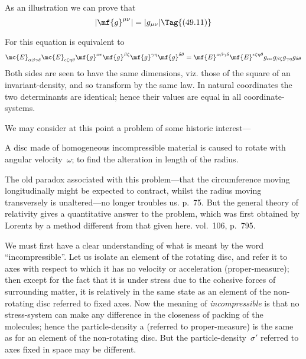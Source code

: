 \documentclass[12pt]{book}
\begin{document}
As an illustration we can prove that
\[
|\mf{g}^{\mu\nu}| = |g_{\mu\nu}|
\Tag{(49.11)}
\]

For this equation is equivalent to
\[
\mc{E}_{\alpha\beta\gamma\delta} \mc{E}_{\epsilon\zeta\eta\theta}
  \mf{g}^{\alpha\epsilon} \mf{g}^{\beta\zeta} \mf{g}^{\gamma\eta} \mf{g}^{\delta\theta} =
\mf{E}^{\alpha\beta\gamma\delta} \mf{E}^{\epsilon\zeta\eta\theta}
  g_{\alpha\epsilon} g_{\beta\zeta} g_{\gamma\eta} g_{\delta\theta}
\]
Both sides are seen to have the same dimensions, viz. those of the square of an invariant\hyp{}density, and so transform
by the same law.
In natural coordinates the two determinants are identical; hence their values are equal in all coordinate\hyp{}systems.

%
%

We may consider at this point a problem of some historic interest---

A disc made of homogeneous incompressible material is caused to rotate
with angular velocity~$\omega$; to find the alteration in length of the radius.

The old paradox associated with this problem---that the circumference
moving longitudinally might be expected to contract, whilst the radius moving
transversely is unaltered---no longer troubles us\footnotemark.\footnotetext
  { p.~75.}
But the general theory of
relativity gives a quantitative answer to the problem, which was first obtained
by Lorentz by a method different from that given here\footnotemark.\footnotetext
  { vol.~106, p.~795.}

We must first have a clear understanding of what is meant by the word
%
``incompressible''. Let us isolate an element of the rotating disc, and refer it to
axes with respect to which it has no velocity or acceleration (proper\hyp{}measure);
then except for the fact that it is under stress due to the cohesive forces of
surrounding matter, it is relatively in the same state as an element of the
non\hyp{}rotating disc referred to fixed axes. Now the meaning of \emph{incompressible}
is that no stress\hyp{}system can make any difference in the closeness of packing
of the molecules; hence the particle\hyp{}density a (referred to proper\hyp{}measure)
is the same as for an element of the non\hyp{}rotating disc. But the particle\hyp{}density~$\sigma'$
referred to axes fixed in space may be different.
\end{document}
